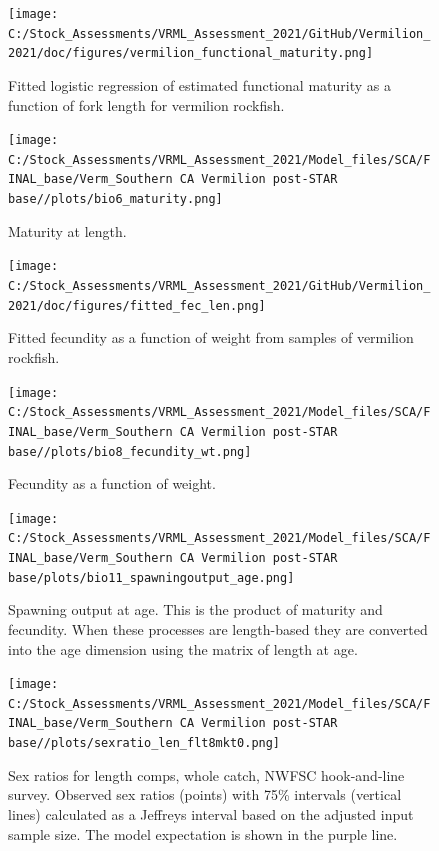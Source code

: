 \documentclass[
  english,
  a4paper,
]{article}
\begin{document}
\begin{figure}
\centering
\texttt{[image: C:/Stock\_Assessments/VRML\_Assessment\_2021/GitHub/Vermilion\_2021/doc/figures/vermilion\_functional\_maturity.png]}
\caption{Fitted logistic regression of estimated functional maturity as a function of fork length for vermilion rockfish.\label{fig:functional-maturity}}
\end{figure}

\begin{figure}
\centering
\texttt{[image: C:/Stock\_Assessments/VRML\_Assessment\_2021/Model\_files/SCA/FINAL\_base/Verm\_Southern CA Vermilion post-STAR base//plots/bio6\_maturity.png]}
\caption{Maturity at length.\label{fig:maturity}}
\end{figure}

\begin{figure}
\centering
\texttt{[image: C:/Stock\_Assessments/VRML\_Assessment\_2021/GitHub/Vermilion\_2021/doc/figures/fitted\_fec\_len.png]}
\caption{Fitted fecundity as a function of weight from samples of vermilion rockfish.\label{fig:fitted-fecundity}}
\end{figure}

\begin{figure}
\centering
\texttt{[image: C:/Stock\_Assessments/VRML\_Assessment\_2021/Model\_files/SCA/FINAL\_base/Verm\_Southern CA Vermilion post-STAR base//plots/bio8\_fecundity\_wt.png]}
\caption{Fecundity as a function of weight.\label{fig:fecundity}}
\end{figure}

\begin{figure}
\centering
\texttt{[image: C:/Stock\_Assessments/VRML\_Assessment\_2021/Model\_files/SCA/FINAL\_base/Verm\_Southern CA Vermilion post-STAR base/plots/bio11\_spawningoutput\_age.png]}
\caption{Spawning output at age. This is the product of maturity and fecundity. When these processes are length-based they are converted into the age dimension using the matrix of length at age.\label{fig:spawnage}}
\end{figure}

\FloatBarrier

\begin{figure}
\centering
\texttt{[image: C:/Stock\_Assessments/VRML\_Assessment\_2021/Model\_files/SCA/FINAL\_base/Verm\_Southern CA Vermilion post-STAR base//plots/sexratio\_len\_flt8mkt0.png]}
\caption{Sex ratios for length comps, whole catch, NWFSC hook-and-line survey. Observed sex ratios (points) with 75\% intervals (vertical lines) calculated as a Jeffreys interval based on the adjusted input sample size. The model expectation is shown in the purple line.\label{fig:sexratio-NWFSC-HKL-3}}
\end{figure}
\end{document}
